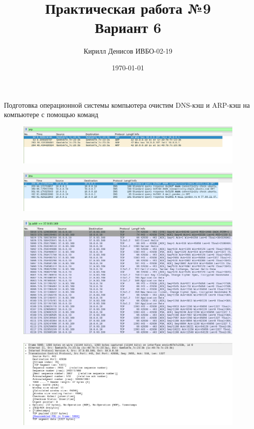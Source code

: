 \documentclass[a4paper,14pt]{extarticle}
\author{Кирилл Денисов ИВБО-02-19}
\title{Практическая работа №9\\Вариант 6}
\date{\today}
\newcommand{\pathToCommonFolder}{/home/denilai/Documents/repos/latex/Common}
\begin{document}
	\newpage
	\newpage
\maketitle

\begin{mypart}{Подготовка операционной системы компьютера}
	очистим DNS-кэш и ARP-кэш на компьютере с помощью команд
\end{mypart}


\begin{figure}
	\centering
	\includegraphics[width=0.7\linewidth]{images/pr-9/arp}
	\caption{}
	\label{fig:arp}
\end{figure}


\begin{figure}
	\centering
	\includegraphics[width=0.7\linewidth]{images/pr-9/dns}
	\caption{}
	\label{fig:dns}
\end{figure}



\begin{figure}
	\centering
	\includegraphics[width=0.7\linewidth]{images/pr-9/web-server}
	\caption{}
	\label{fig:web-server}
\end{figure}


\begin{figure}
	\centering
	\includegraphics[width=0.7\linewidth]{images/pr-9/tcp-ack}
	\caption{}
	\label{fig:tcp-ack}
\end{figure}
\end{document}
